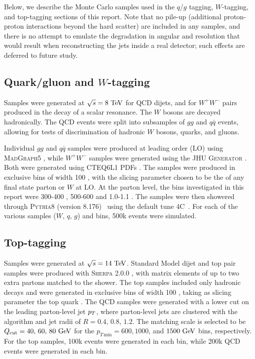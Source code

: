 Below, we describe the Monte Carlo samples used in the $q$/$g$ tagging,
$W$-tagging, and top-tagging sections of this report. Note
that no pile-up (additional proton-proton
interactions beyond the hard scatter) are included in any samples, and there is no
attempt to emulate the degradation in angular and \pt resolution that
would result when reconstructing the jets inside a real detector; such effects are deferred to 
future study.


\subsection{Quark/gluon and $W$-tagging}

Samples were generated at $\sqrt{s} = 8\TeV$ for QCD dijets, and for $W^+W^-$
pairs produced in the decay of a scalar resonance. The $W$ bosons are
decayed hadronically. The QCD events were split into subsamples of $gg$ and
$q\bar{q}$ events, allowing for tests of discrimination of hadronic $W$ bosons,
quarks, and gluons.

Individual $gg$ and $q\bar{q}$ samples were produced at leading order (LO)
using \textsc{MadGraph5} \cite{Alwall:2011uj}, while $W^+W^-$ samples were generated
using the \textsc{JHU Generator} \cite{Gao:2010qx,Bolognesi:2012mm,Anderson:2013afp}.
Both were generated using \textsc{CTEQ6L1} PDFs \cite{Pumplin:2002vw}. The samples
were produced in exclusive \pt bins of width 100 \GeV, with the slicing parameter
chosen to be the \pt of any final state parton or $W$ at LO. At the parton level,
the \pt bins investigated in this report were 300-400 \GeV, 500-600 \GeV and
1.0-1.1 \TeV. 
The samples were then showered through \textsc{Pythia8}
(version 8.176)~\cite{Sjostrand:2007gs} using the default tune
4C~\cite{Buckley:2011ms}. For each of the various samples ($W,\,q,\,g$) and \pt bins,
500k events were simulated.





\subsection{Top-tagging} \label{sec:top-samples}
Samples were generated at $\sqrt{s}=14\TeV$. Standard Model dijet and top pair
samples were produced with \textsc{Sherpa} 2.0.0 \cite{Gleisberg:2008ta,Schumann:2007mg,Krauss:2001iv,Gleisberg:2008fv,Hoeche:2009rj,Schonherr:2008av}, with matrix elements of up
to two extra partons matched to the shower. The top samples included only
hadronic decays and  were generated in exclusive \pt bins of width 100 \GeV,
taking as slicing parameter the top quark \pt. The QCD samples were generated
with a lower cut on the leading parton-level jet $p_T$, where parton-level jets
are clustered with the \antikt algorithm and jet radii of
$R= 0.4,\,0.8,\,1.2$. The matching scale is selected to be
$Q_{\rm cut}=40,\,60,\,80 \GeV$ for the $p_{T\,\text{min}}=600, 1000$, and
$1500 \GeV$ bins, respectively. For the top samples, 100k events were generated
in each bin, while 200k QCD events were generated in each bin.
